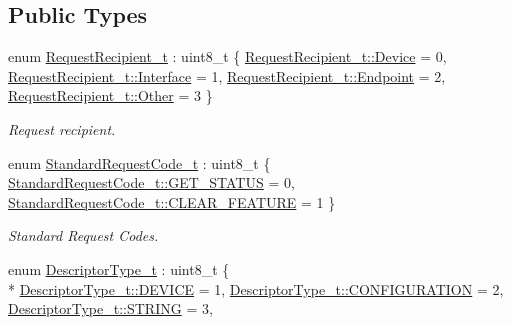 \subsection*{Public Types}
\begin{DoxyCompactItemize}
\item 
enum \hyperlink{classmdt_usb_control_transfer_a372afc0db22a4ec839bab18cfbed35c5}{Request\-Recipient\-\_\-t} \-: uint8\-\_\-t \{ \hyperlink{classmdt_usb_control_transfer_a372afc0db22a4ec839bab18cfbed35c5ae0ac20adce6ffee48c7151b070aa5737}{Request\-Recipient\-\_\-t\-::\-Device} = 0, 
\hyperlink{classmdt_usb_control_transfer_a372afc0db22a4ec839bab18cfbed35c5a3c1aac82863ed9e5a9aca8ce687f711d}{Request\-Recipient\-\_\-t\-::\-Interface} = 1, 
\hyperlink{classmdt_usb_control_transfer_a372afc0db22a4ec839bab18cfbed35c5a2a6ba72e93aa7fa676d07973ed2716bb}{Request\-Recipient\-\_\-t\-::\-Endpoint} = 2, 
\hyperlink{classmdt_usb_control_transfer_a372afc0db22a4ec839bab18cfbed35c5a6311ae17c1ee52b36e68aaf4ad066387}{Request\-Recipient\-\_\-t\-::\-Other} = 3
 \}
\begin{DoxyCompactList}\small\item\em Request recipient. \end{DoxyCompactList}\item 
enum \hyperlink{classmdt_usb_control_transfer_a9a13f68d5d4998dd8564c4e4c6278c77}{Standard\-Request\-Code\-\_\-t} \-: uint8\-\_\-t \{ \hyperlink{classmdt_usb_control_transfer_a9a13f68d5d4998dd8564c4e4c6278c77a055987b2a1850b3a8f19befda5ea79ab}{Standard\-Request\-Code\-\_\-t\-::\-G\-E\-T\-\_\-\-S\-T\-A\-T\-U\-S} = 0, 
\hyperlink{classmdt_usb_control_transfer_a9a13f68d5d4998dd8564c4e4c6278c77aba7daed095c1e4f1dc05e56562a04c81}{Standard\-Request\-Code\-\_\-t\-::\-C\-L\-E\-A\-R\-\_\-\-F\-E\-A\-T\-U\-R\-E} = 1
 \}
\begin{DoxyCompactList}\small\item\em Standard Request Codes. \end{DoxyCompactList}\item 
enum \hyperlink{classmdt_usb_control_transfer_a80b0f5ac6d8ae7b7e7471b012c34937d}{Descriptor\-Type\-\_\-t} \-: uint8\-\_\-t \{ \\*
\hyperlink{classmdt_usb_control_transfer_a80b0f5ac6d8ae7b7e7471b012c34937dae10b6ab6a278644ce40631f62f360b6d}{Descriptor\-Type\-\_\-t\-::\-D\-E\-V\-I\-C\-E} = 1, 
\hyperlink{classmdt_usb_control_transfer_a80b0f5ac6d8ae7b7e7471b012c34937dad08e68ea80bc3bf47a03757579c11900}{Descriptor\-Type\-\_\-t\-::\-C\-O\-N\-F\-I\-G\-U\-R\-A\-T\-I\-O\-N} = 2, 
\hyperlink{classmdt_usb_control_transfer_a80b0f5ac6d8ae7b7e7471b012c34937da63b588d5559f64f89a416e656880b949}{Descriptor\-Type\-\_\-t\-::\-S\-T\-R\-I\-N\-G} = 3, 

\end{DoxyCompactItemize}
